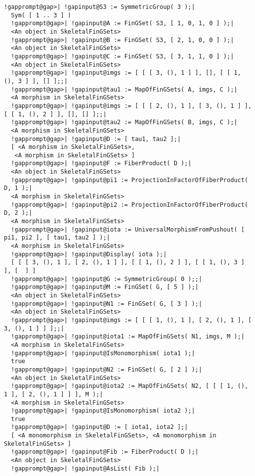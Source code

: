 \documentclass[a4paper,11pt]{report}
\begin{document}
{{{\begin{Verbatim}[commandchars=!@|,fontsize=\small,frame=single,label=Example]
  !gapprompt@gap>| !gapinput@S3 := SymmetricGroup( 3 );|
  Sym( [ 1 .. 3 ] )
  !gapprompt@gap>| !gapinput@A := FinGSet( S3, [ 1, 0, 1, 0 ] );|
  <An object in SkeletalFinGSets>
  !gapprompt@gap>| !gapinput@B := FinGSet( S3, [ 2, 1, 0, 0 ] );|
  <An object in SkeletalFinGSets>
  !gapprompt@gap>| !gapinput@C := FinGSet( S3, [ 3, 1, 1, 0 ] );|
  <An object in SkeletalFinGSets>
  !gapprompt@gap>| !gapinput@imgs := [ [ [ 3, (), 1 ] ], [], [ [ 1, (), 3 ] ], [] ];;|
  !gapprompt@gap>| !gapinput@tau1 := MapOfFinGSets( A, imgs, C );|
  <A morphism in SkeletalFinGSets>
  !gapprompt@gap>| !gapinput@imgs := [ [ [ 2, (), 1 ], [ 3, (), 1 ] ], [ [ 1, (), 2 ] ], [], [] ];;|
  !gapprompt@gap>| !gapinput@tau2 := MapOfFinGSets( B, imgs, C );|
  <A morphism in SkeletalFinGSets>
  !gapprompt@gap>| !gapinput@D := [ tau1, tau2 ];|
  [ <A morphism in SkeletalFinGSets>, 
   <A morphism in SkeletalFinGSets> ]
  !gapprompt@gap>| !gapinput@F := FiberProduct( D );|
  <An object in SkeletalFinGSets>
  !gapprompt@gap>| !gapinput@pi1 := ProjectionInFactorOfFiberProduct( D, 1 );|
  <A morphism in SkeletalFinGSets>
  !gapprompt@gap>| !gapinput@pi2 := ProjectionInFactorOfFiberProduct( D, 2 );|
  <A morphism in SkeletalFinGSets>
  !gapprompt@gap>| !gapinput@iota := UniversalMorphismFromPushout( [ pi1, pi2 ], [ tau1, tau2 ] );|
  <A morphism in SkeletalFinGSets>
  !gapprompt@gap>| !gapinput@Display( iota );|
  [ [ [ 3, (), 1 ], [ 2, (), 1 ] ], [ [ 1, (), 2 ] ], [ [ 1, (), 3 ] ], [  ] ]
  !gapprompt@gap>| !gapinput@G := SymmetricGroup( 0 );;|
  !gapprompt@gap>| !gapinput@M := FinGSet( G, [ 5 ] );|
  <An object in SkeletalFinGSets>
  !gapprompt@gap>| !gapinput@N1 := FinGSet( G, [ 3 ] );|
  <An object in SkeletalFinGSets>
  !gapprompt@gap>| !gapinput@imgs := [ [ [ 1, (), 1 ], [ 2, (), 1 ], [ 3, (), 1 ] ] ];;|
  !gapprompt@gap>| !gapinput@iota1 := MapOfFinGSets( N1, imgs, M );|
  <A morphism in SkeletalFinGSets>
  !gapprompt@gap>| !gapinput@IsMonomorphism( iota1 );|
  true
  !gapprompt@gap>| !gapinput@N2 := FinGSet( G, [ 2 ] );|
  <An object in SkeletalFinGSets>
  !gapprompt@gap>| !gapinput@iota2 := MapOfFinGSets( N2, [ [ [ 1, (), 1 ], [ 2, (), 1 ] ] ], M );|
  <A morphism in SkeletalFinGSets>
  !gapprompt@gap>| !gapinput@IsMonomorphism( iota2 );|
  true
  !gapprompt@gap>| !gapinput@D := [ iota1, iota2 ];|
  [ <A monomorphism in SkeletalFinGSets>, <A monomorphism in SkeletalFinGSets> ]
  !gapprompt@gap>| !gapinput@Fib := FiberProduct( D );|
  <An object in SkeletalFinGSets>
  !gapprompt@gap>| !gapinput@AsList( Fib );|

\end{Verbatim}}}}
\end{document}
